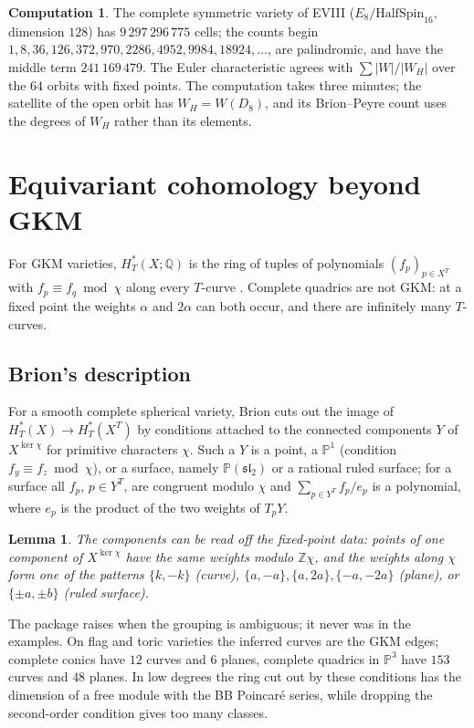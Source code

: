 \documentclass[11pt]{amsart}
\newtheorem{lemma}[theorem]{Lemma}
\theoremstyle{definition}
\newtheorem{computation}[theorem]{Computation}
\theoremstyle{remark}
\newcommand{\PP}{\mathbb{P}}
\newcommand{\QQ}{\mathbb{Q}}
\newcommand{\ZZ}{\mathbb{Z}}
\begin{document}
\begin{computation}\label{comp:eviii}
The complete symmetric variety of EVIII ($E_8/\mathrm{HalfSpin}_{16}$,
dimension $128$) has $9\,297\,296\,775$ cells; the counts begin $1, 8, 36,
126, 372, 970, 2286, 4952, 9984, 18924,\dots$, are palindromic, and have the
middle term $241\,169\,479$. The Euler characteristic agrees with
$\sum|W|/|W_H|$ over the $64$ orbits with fixed points. The computation takes
three minutes; the satellite of the open orbit has $W_H=W(D_8)$, and its
Brion--Peyre count uses the degrees of $W_H$ rather than its elements.
\end{computation}

\section{Equivariant cohomology beyond GKM}\label{sec:cohomology}

For GKM varieties, $H_T^*(X;\QQ)$ is the ring of tuples of polynomials
$(f_p)_{p\in X^T}$ with $f_p\equiv f_q\bmod\chi$ along every $T$-curve
\cite{GKM}. Complete quadrics are not GKM: at a fixed point the weights
$\alpha$ and $2\alpha$ can both occur, and there are infinitely many
$T$-curves.

\subsection{Brion's description}
For a smooth complete spherical variety, Brion \cite[Thm.~6 and proof of
Thm.~9]{Brion98} cuts out the image of $H_T^*(X)\to H_T^*(X^T)$ by
conditions attached to the connected components $Y$ of $X^{\ker\chi}$ for
primitive characters $\chi$. Such a $Y$ is a point, a $\PP^1$ (condition
$f_y\equiv f_z\bmod\chi$), or a surface, namely $\PP(\mathfrak{sl}_2)$ or a
rational ruled surface; for a surface all $f_p$, $p\in Y^T$, are congruent
modulo $\chi$ and $\sum_{p\in Y^T} f_p/e_p$ is a polynomial, where $e_p$ is
the product of the two weights of $T_pY$.

\begin{lemma}\label{lem:components}
The components can be read off the fixed-point data: points of one
component of $X^{\ker\chi}$ have the same weights modulo $\ZZ\chi$, and the
weights along $\chi$ form one of the patterns
$\{k,-k\}$ (curve), $\{a,-a\},\{a,2a\},\{-a,-2a\}$ (plane), or
$\{\pm a,\pm b\}$ (ruled surface).
\end{lemma}
The package raises when the grouping is ambiguous; it never was in the
examples. On flag and toric varieties the inferred curves are the GKM
edges; complete conics have $12$ curves and $6$ planes, complete quadrics
in $\PP^3$ have $153$ curves and $48$ planes. In low degrees the ring cut
out by these conditions has the dimension of a free module with the BB
Poincar\'e series, while dropping the second-order condition gives too many
classes.
\end{document}
